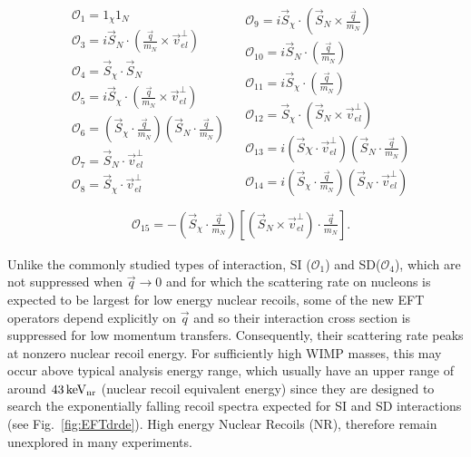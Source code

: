 \begingroup
\belowdisplayskip=0pt
\begin{align*}
\begin{split} 
&\mathcal{O}_1 = 1_{\chi} 1_N  \\
&\mathcal{O}_3 = i\vec{S}_N\cdot (\frac{\vec{q}}{m_N}\times\vec{v}_{el}^{\perp}) \\
&\mathcal{O}_4 = \vec{S}_{\chi}\cdot \vec{S}_N \\
&\mathcal{O}_5 = i\vec{S}_{\chi}\cdot (\frac{\vec{q}}{m_N}\times\vec{v}_{el}^{\perp}) \\
&\mathcal{O}_6 = (\vec{S}_{\chi} \cdot \frac{\vec{q}}{m_N})(\vec{S}_N \cdot \frac{\vec{q}}{m_N}) \\
&\mathcal{O}_7 = \vec{S}_N \cdot \vec{v}_{el}^{\perp} \\
&\mathcal{O}_8 = \vec{S}_{\chi} \cdot \vec{v}_{el}^{\perp}  \\
\end{split}
\begin{split}
&\mathcal{O}_9 = i\vec{S}_{\chi} \cdot(\vec{S}_N \times \frac{\vec{q}}{m_N}) \\
&\mathcal{O}_{10} = i\vec{S}_N \cdot (\frac{\vec{q}}{m_N}) \\
&\mathcal{O}_{11} = i\vec{S}_{\chi} \cdot (\frac{\vec{q}}{m_N}) \\
&\mathcal{O}_{12} = \vec{S}_\chi \cdot (\vec{S}_N \times \vec{v}_{el}^{\perp}) \\
&\mathcal{O}_{13} = i(\vec{S}\chi \cdot \vec{v}_{el}^{\perp})(\vec{S}_N \cdot \frac{\vec{q}}{m_N})\\
&\mathcal{O}_{14} = i(\vec{S}_\chi \cdot \frac{\vec{q}}{m_N})(\vec{S}_N \cdot \vec{v}_{el}^{\perp}) \\
\end{split}
\end{align*}
\endgroup
\begingroup
\abovedisplayskip=0pt
\begin{align}
&\mathcal{O}_{15} = -(\vec{S}_\chi \cdot \frac{\vec{q}}{m_N})\left[(\vec{S}_N \times \vec{v}_{el}^{\perp})\cdot \frac{\vec{q}}{m_N}\right].
\label{eq:OpDef}
\end{align}
\endgroup

Unlike the commonly studied types of interaction, SI ($\mathcal{O}_1$) and SD($\mathcal{O}_4$), which are not suppressed when $\vec{q} \rightarrow 0$ and for which the scattering rate on nucleons is expected to be largest for low energy nuclear recoils, some of the new EFT operators depend explicitly on $\vec{q}$ and so their interaction cross section is suppressed for low momentum transfers. Consequently, their scattering rate peaks at nonzero nuclear recoil energy. For sufficiently high WIMP masses, this may occur above typical analysis energy range, which usually have an upper range of around $ 43\,\mathrm{keV_\mathrm{nr}}$ (nuclear recoil equivalent
energy) since they are designed to search the exponentially falling recoil spectra expected for SI and SD interactions (see Fig.~\ref{fig:EFTdrde}). High energy Nuclear Recoils (NR), therefore remain unexplored in many experiments.

